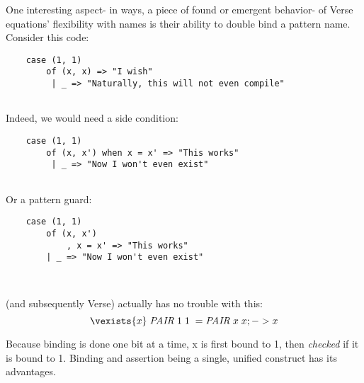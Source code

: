 \documentclass{article}
\begin{document}
One interesting aspect- in ways, a piece of found or emergent behavior- 
of Verse equations' flexibility with names is their ability to double bind a 
pattern name. Consider this code: 

\begin{verbatim}
    case (1, 1)
        of (x, x) => "I wish"
         | _ => "Naturally, this will not even compile"
    
\end{verbatim}

Indeed, we would need a side condition: 
\begin{verbatim}
    case (1, 1)
        of (x, x') when x = x' => "This works"
         | _ => "Now I won't even exist"
    
\end{verbatim}

Or a pattern guard: 

\begin{verbatim}
    case (1, 1)
        of (x, x')
            , x = x' => "This works"
        | _ => "Now I won't even exist"

    
\end{verbatim}
{\VMinus} (and subsequently Verse) actually has no trouble with this: 
\[
    \vexists{x}\; \mathit{PAIR}\; 1\; 1\; = \mathit{PAIR}\; x\; x; -> x 
\]

Because binding is done one bit at a time, x is first bound to 1, then 
\textit{checked} if it is bound to 1. Binding and assertion being a 
single, unified construct has its advantages. 
\end{document}
